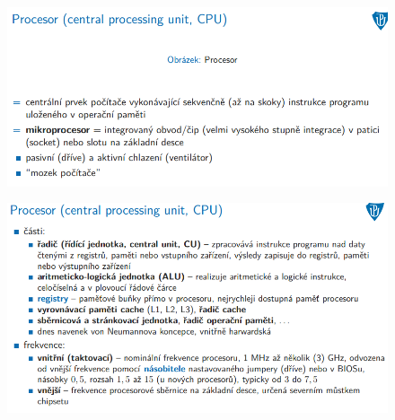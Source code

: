 \documentclass[10pt,a4paper]{article}
\begin{document}

\begin{figure} [h]
	\includegraphics[scale=0.65]{img/prvni_odstavec/otazka5/procesor1.png}	
\end{figure}

\begin{figure} [h]
	\includegraphics[scale=0.65]{img/prvni_odstavec/otazka5/procesor2.png}	
\end{figure}
\end{document}

